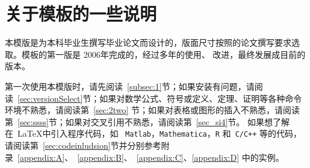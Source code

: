 \large{}
\section{关于模板的一些说明}%
本模版是为{\university\school}本科毕业生撰写毕业论文而设计的，版面尺寸按照{\school}的论文撰写要求选取。模板的第一版是
2006年完成的，经过多年的使用、 改进，最终发展成目前的版本。

第一次使用本模版时，请先阅读~\ref{subsec:1}节；如果安装\CTeX{}\index{\CTeX}有问题，请阅读~\ref{sec:versionSelect}节；如果对数学公式、符号或定义、定理、证明等各种命令环境不熟悉，请阅读第~\ref{sec:2two}
节；如果对表格或图形的插入不熟悉，请阅读第~\ref{sec:ssss}节；如果对交叉引用不熟悉，请阅读第~\ref{sec_si4}节。 如果想了解在~\LaTeX 中引入程序代码，如
~{\tt Matlab}，{\tt Mathematica}，{\tt R} 和~{\tt C/C++} 等的代码，请阅读第~\ref{sec:codeinludsion}节并分别参考附录~\ref{appendix:A}、~\ref{appendix:B}、~\ref{appendix:C}、\ref{appendix:D} 中的实例。
